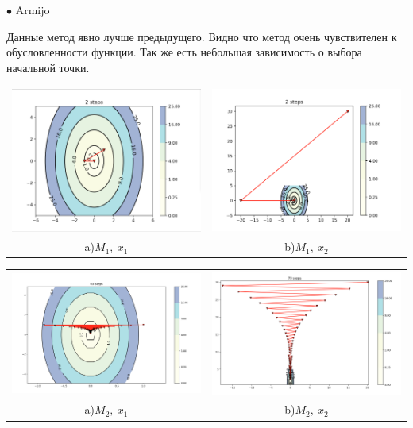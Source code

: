 \documentclass{article}
\theoremstyle{definition}
\theoremstyle{remark}
\begin{document}
$\bullet$ Armijo

Данные метод явно лучше предыдущего.
Видно что метод очень чувствителен к обусловленности функции. Так же есть небольшая зависимость о выбора начальной точки.

\begin{center}
\begin{tabular}{cc}
\includegraphics[width=0.49\linewidth]{11.png} &
\includegraphics[width=0.49\linewidth]{12.png} \\
 a)$M_1,\ x_1$ & b)$M_1,\ x_2$\\
\end{tabular}
\end{center}

\begin{center}
\begin{tabular}{cc}
\includegraphics[width=0.49\linewidth]{13.png} &
\includegraphics[width=0.49\linewidth]{14.png} \\
 a)$M_2,\ x_1$ & b)$M_2,\ x_2$\\
\end{tabular}
\end{center}
\end{document}
